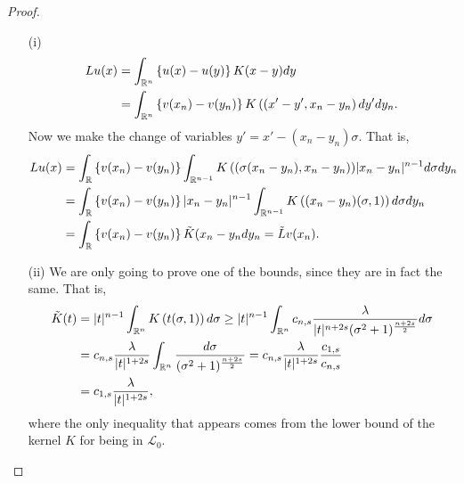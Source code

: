 \begin{proof}
\begin{enumerate}
\item[(i)]
\begin{align*}
Lu(x) &= \int_{\mathbb{R}^n} \left\{ u(x)-u(y) \right\} K(x-y) dy \\
&=\int_{\mathbb{R}^n} \left\{ v(x_n)-v(y_n) \right\} K\left((x'-y',x_n-y_n\right) dy'dy_n.
\end{align*}
Now we make the change of variables $y' = x'-(x_n-y_n)\sigma$. That is,
\begin{align*}
Lu(x) &= \int_{\mathbb{R}} \left\{ v(x_n)-v(y_n) \right\} \int_{\mathbb{R}^{n-1}} K\left((\sigma(x_n-y_n),x_n-y_n\right)) |x_n-y_n|^{n-1} d\sigma dy_n \\
&= \int_{\mathbb{R}} \left\{ v(x_n)-v(y_n) \right\} |x_n-y_n|^{n-1} \int_{\mathbb{R}^{n-1}} K\left((x_n-y_n)(\sigma,1)\right) d\sigma dy_n \\
&= \int_{\mathbb{R}} \left\{ v(x_n)-v(y_n) \right\} \tilde{K}(x_n-y_n dy_n = \tilde{L}v(x_n). \\
\end{align*}
\item[(ii)] We are only going to prove one of the bounds, since they are in fact the same. That is,
\begin{align*}
\tilde{K}(t) &= |t|^{n-1} \int_{\mathbb{R}^n} K\left(t(\sigma,1)\right) d\sigma \geq |t|^{n-1} \int_{\mathbb{R}^n} c_{n,s} \frac{\lambda}{|t|^{n+2s}(\sigma^2+
1)^{\frac{n+2s}{2}}} d\sigma \\
&= c_{n,s} \frac{\lambda}{|t|^{1+2s}} \int_{\mathbb{R}^n} \frac{d\sigma}{(\sigma^2+1)^{\frac{n+2s}{2}}} = c_{n,s} \frac{\lambda}{|t|^{1+2s}} \frac{c_{1,s}}{c_{n,s}} \\
&= c_{1,s} \frac{\lambda}{|t|^{1+2s}},
\end{align*}
where the only inequality that appears comes from the lower bound of the kernel $K$ for being in $\mathcal{L}_0$.
\end{enumerate}
\end{proof}
